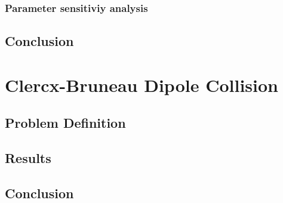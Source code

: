 \subsubsection{Parameter sensitiviy analysis}
\label{subsubsec:psa}

\subsection{Conclusion}



\section{Clercx-Bruneau Dipole Collision}

\subsection{Problem Definition}

\subsection{Results}

\subsection{Conclusion}

%
%
%
%

%
%	
	

